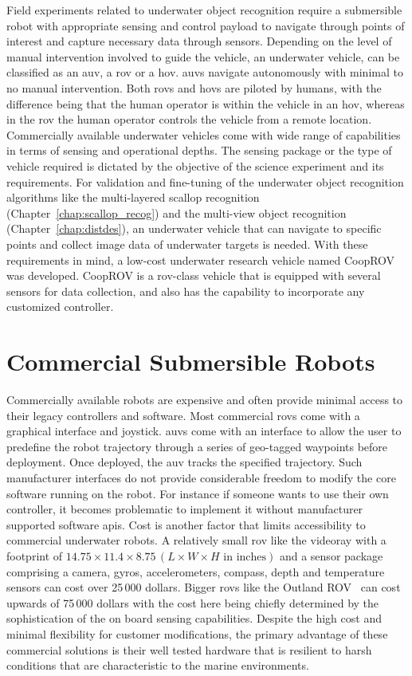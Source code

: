 \documentclass {udthesis}
\begin{document}
Field experiments related to underwater object recognition require a submersible robot with appropriate sensing and control payload to navigate through points of interest and capture necessary data through sensors. Depending on the level of manual intervention involved to guide the vehicle, an underwater vehicle, can be classified as an \gls{auv}, a \gls{rov} or a \gls{hov}. \gls{auv}s navigate autonomously with minimal to no manual intervention. Both \gls{rov}s and \gls{hov}s are piloted by humans, with the difference being that the human operator is within the vehicle in an \gls{hov}, whereas in the \gls{rov} the human operator controls the vehicle from a remote location. Commercially available underwater vehicles come with wide range of capabilities in terms of sensing and operational depths. The sensing package or the type of vehicle required is dictated by the objective of the science experiment and its requirements. For validation and fine-tuning of the underwater object recognition algorithms like the 
multi-layered scallop recognition (Chapter~\ref{chap:scallop_recog}) and the multi-view object recognition (Chapter~\ref{chap:distdes}), an underwater vehicle that can navigate to specific points and collect image data of underwater targets is needed. With these requirements in mind, a low-cost underwater research vehicle named CoopROV was developed. CoopROV is a \gls{rov}-class vehicle that is equipped with several sensors for data collection, and also has the capability to incorporate any customized controller.

\section{Commercial Submersible Robots}

Commercially available robots are expensive and often provide minimal access to their legacy controllers and software. Most commercial \gls{rov}s come with a graphical interface and joystick. \gls{auv}s come with an interface to allow the user to predefine the robot trajectory through a series of geo-tagged waypoints before deployment. Once deployed, the \gls{auv} tracks the specified trajectory. Such manufacturer interfaces do not provide considerable freedom to modify the core software running on the robot. For instance if someone wants to use their own controller, it becomes problematic to implement it without manufacturer supported software \gls{api}s. Cost is another factor that limits accessibility to commercial underwater robots. A relatively small \gls{rov} like the videoray \cite{videoray} with a footprint of $14.75\times 11.4\times 8.75 \,(L\times W\times H \text{ in inches})$ and a sensor package comprising a camera, gyros, accelerometers, compass, depth and temperature sensors can cost 
over 25\,000 dollars. Bigger \gls{rov}s like the Outland ROV~\cite{outlandrov} can cost upwards of 75\,000 dollars with the cost here being chiefly determined by the sophistication of the on board sensing capabilities. Despite the high cost and minimal flexibility for customer modifications, the primary advantage of these commercial solutions is their well tested hardware that is resilient to harsh conditions that are characteristic to the marine environments.
\end{document}
